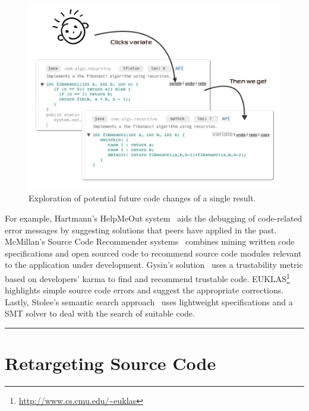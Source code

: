 \begin{figure}[!ht]
    \centering
    \includegraphics[width=\textwidth]{images/basealternative}
    \caption{Exploration of potential future code changes of a single result.}
    \label{fig:basealternative}
\end{figure}

For example, Hartmann's HelpMeOut system~\cite{Hartmann:2010hx} aids the debugging of code-related error messages by suggesting solutions that peers have applied in the past. McMillan's Source Code Recommender systems~\cite{McMillan:2012dj} combines mining written code specifications and open sourced code to recommend source code modules relevant to the application under development. Gysin's solution~\cite{Gysin:2010kt} uses a trustability metric based on developers' karma to find and recommend trustable code. EUKLAS\footnote{\url{http://www.cs.cmu.edu/~euklas}} highlights simple source code errors and suggest the appropriate corrections. Lastly, Stolee's semantic search approach~\cite{Stolee:2012wp} uses lightweight specifications and a SMT solver to deal with the search of suitable code.  


\fancybreak{\pfbreakdisplay}

\section{Retargeting Source Code}
\label{sec:retargetingcode}

